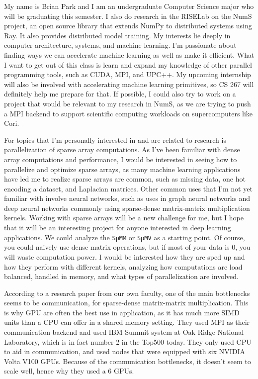 \documentclass[11pt]{article}
\begin{document}
My name is Brian Park and I am an undergraduate Computer Science major who will be graduating this semester. I also do research in the RISELab on the NumS project, an open source library that extends NumPy to distributed systems using Ray. It also provides distributed model training. My interests lie deeply in computer architecture, systems, and machine learning. I'm passionate about finding ways we can accelerate machine learning as well as make it efficient. What I want to get out of this class is learn and expand my knowledge of other parallel programming tools, such as CUDA, MPI, and UPC++. My upcoming internship will also be involved with accelerating machine learning primitives, so CS 267 will definitely help me prepare for that. If possible, I could also try to work on a project that would be relevant to my research in NumS, as we are trying to push a MPI backend to support scientific computing workloads on supercomputers like Cori.

For topics that I'm personally interested in and are related to research is parallelization of sparse array computations. As I've been familiar with dense array computations and performance, I would be interested in seeing how to parallelize and optimize sparse arrays, as many machine learning applications have led me to realize sparse arrays are common, such as missing data, one hot encoding a dataset, and Laplacian matrices. Other common uses that I'm not yet familiar with involve neural networks, such as uses in graph neural networks and deep neural networks commonly using sparse-dense matrix-matrix multiplication kernels. \cite{10.1145/3447818.3461472} Working with sparse arrays will be a new challenge for me, but I hope that it will be an interesting project for anyone interested in deep learning applications. We could analyze the \verb|SpMM| or \verb|SpMV| as a starting point. Of course, you could naively use dense matrix operations, but if most of your data is 0, you will waste computation power. I would be interested how they are sped up and how they perform with different kernels, analyzing how computations are load balanced, handled in memory, and what types of parallelization are involved.

According to a research paper from our own faculty, one of the main bottlenecks seems to be communication, for sparse-dense matrix-matrix multiplication. \cite{10.1145/3447818.3461472} This is why GPU are often the best use in application, as it has much more SIMD units than a CPU can offer in a shared memory setting. They used MPI as their communication backend and used IBM Summit system at Oak Ridge National Laboratory, which is in fact number 2 in the Top500 today. They only used CPU to aid in communication, and used nodes that were equipped with six NVIDIA Volta V100 GPUs. Because of the communication bottlenecks, it doesn't seem to scale well, hence why they used a 6 GPUs.
\end{document}

